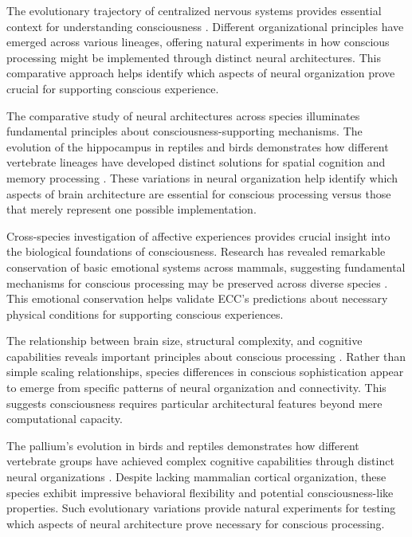 \begin{refsection}
The evolutionary trajectory of centralized nervous systems provides essential context for understanding consciousness \cite{Northcutt2012}. Different organizational principles have emerged across various lineages, offering natural experiments in how conscious processing might be implemented through distinct neural architectures. This comparative approach helps identify which aspects of neural organization prove crucial for supporting conscious experience.

The comparative study of neural architectures across species illuminates fundamental principles about consciousness-supporting mechanisms. The evolution of the hippocampus in reptiles and birds demonstrates how different vertebrate lineages have developed distinct solutions for spatial cognition and memory processing \cite{Striedter2016}. These variations in neural organization help identify which aspects of brain architecture are essential for conscious processing versus those that merely represent one possible implementation.

Cross-species investigation of affective experiences provides crucial insight into the biological foundations of consciousness. Research has revealed remarkable conservation of basic emotional systems across mammals, suggesting fundamental mechanisms for conscious processing may be preserved across diverse species \cite{Panksepp2011}. This emotional conservation helps validate ECC's predictions about necessary physical conditions for supporting conscious experiences.

The relationship between brain size, structural complexity, and cognitive capabilities reveals important principles about conscious processing \cite{Roth2005}. Rather than simple scaling relationships, species differences in conscious sophistication appear to emerge from specific patterns of neural organization and connectivity. This suggests consciousness requires particular architectural features beyond mere computational capacity.

The pallium's evolution in birds and reptiles demonstrates how different vertebrate groups have achieved complex cognitive capabilities through distinct neural organizations \cite{Jarvis2009}. Despite lacking mammalian cortical organization, these species exhibit impressive behavioral flexibility and potential consciousness-like properties. Such evolutionary variations provide natural experiments for testing which aspects of neural architecture prove necessary for conscious processing.


\end{refsection}
